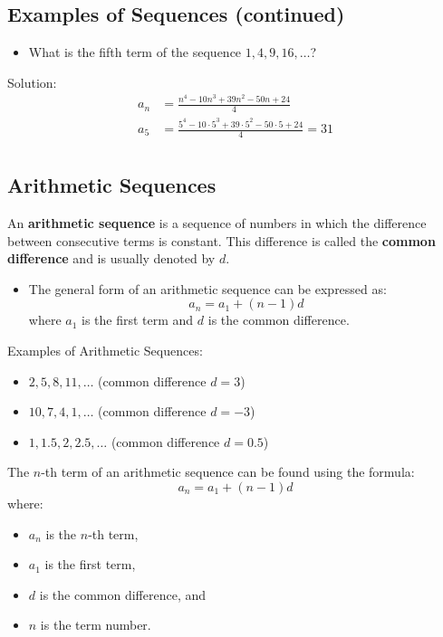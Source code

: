 \subsection{Examples of Sequences (continued)}
\begin{itemize}
    \item What is the fifth term of the sequence \(1, 4, 9, 16, \ldots\)?
\end{itemize}
Solution:
\begin{align*}
    a_{n} &= \frac{n^{4} - 10n^{3}+ 39n^{2} - 50n + 24}{4} \\
    a_{5} &= \frac{5^{4} - 10 \cdot 5^{3} + 39 \cdot 5^{2} - 50 \cdot 5 + 24}{4} = 31 \\
\end{align*}

\subsection{Arithmetic Sequences}
An \textbf{arithmetic sequence} is a sequence of numbers in which the difference between consecutive terms is constant. This difference is called the \textbf{common difference} and is usually denoted by \(d\).
\begin{itemize}
    \item The general form of an arithmetic sequence can be expressed as:
    \[ a_n = a_1 + (n-1)d \]
    where \(a_1\) is the first term and \(d\) is the common difference.
\end{itemize}
Examples of Arithmetic Sequences:
\begin{itemize}
    \item \(2, 5, 8, 11, \ldots\) (common difference \(d = 3\))
    \item \(10, 7, 4, 1, \ldots\) (common difference \(d = -3\))
    \item \(1, 1.5, 2, 2.5, \ldots\) (common difference \(d = 0.5\))
\end{itemize}
The \(n\)-th term of an arithmetic sequence can be found using the formula:
\[ a_n = a_1 + (n-1)d \]
where:
\begin{itemize}
    \item \(a_n\) is the \(n\)-th term,
    \item \(a_1\) is the first term,
    \item \(d\) is the common difference, and
    \item \(n\) is the term number.
\end{itemize}


